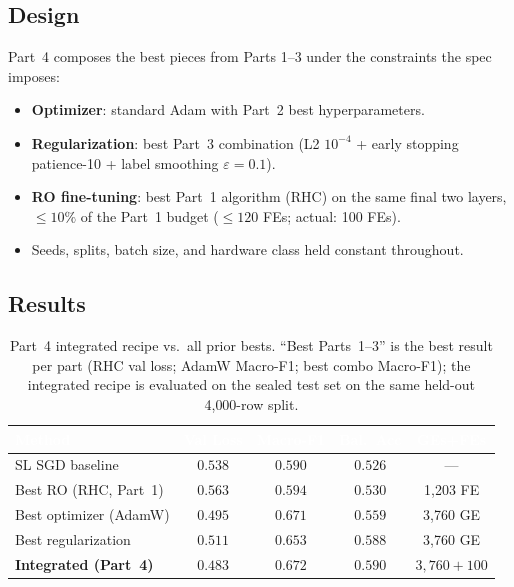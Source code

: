 \documentclass[conference]{IEEEtran}
\begin{document}
\subsection{Design}\label{sec:p4:design}
Part~4 composes the best pieces from Parts 1--3 under the constraints
the spec imposes:
\begin{itemize}[leftmargin=*]
\item \textbf{Optimizer}: standard Adam with Part~2 best hyperparameters.
\item \textbf{Regularization}: best Part~3 combination
(L2 $10^{-4}$ + early stopping patience-10 + label smoothing $\varepsilon{=}0.1$).
\item \textbf{RO fine-tuning}: best Part~1 algorithm (RHC) on the same
final two layers, $\leq10\%$ of the Part~1 budget
($\leq120$ FEs; actual: 100 FEs).
\item Seeds, splits, batch size, and hardware class held constant throughout.
\end{itemize}

\subsection{Results}\label{sec:p4:results}

\begin{table}[t]\centering
\caption{Part~4 integrated recipe vs.\ all prior bests.
``Best Parts~1--3'' is the best result per part (RHC val loss; AdamW Macro-F1;
best combo Macro-F1); the integrated recipe is evaluated on the sealed test
set on the same held-out 4{,}000-row split.}
\label{tab:p4}
\centering\small
{}
\begin{tabularx}{\linewidth}{Xcccc}
\toprule
\rowcolor{denimdark}
\textcolor{white}{\textbf{Method}} &
\textcolor{white}{\textbf{Val Loss}} & \textcolor{white}{\textbf{Macro-F1}} & \textcolor{white}{\textbf{Bal.\ Acc}} & \textcolor{white}{\textbf{GEs+FEs}} \\
\midrule
SL SGD baseline       & $0.538$ & $0.590$ & $0.526$ & --- \\
Best RO (RHC, Part~1) & $0.563$ & $0.594$ & $0.530$ & 1{,}203 FE \\
Best optimizer (AdamW) & $0.495$ & $0.671$ & $0.559$ & 3{,}760 GE \\
Best regularization    & $0.511$ & $0.653$ & $0.588$ & 3{,}760 GE \\
\textbf{Integrated (Part~4)} & $\mathbf{0.483}$ & $\mathbf{0.672}$ &
$\mathbf{0.590}$ & $3{,}760{+}100$ \\
\bottomrule
\end{tabularx}
\end{table}
\end{document}
